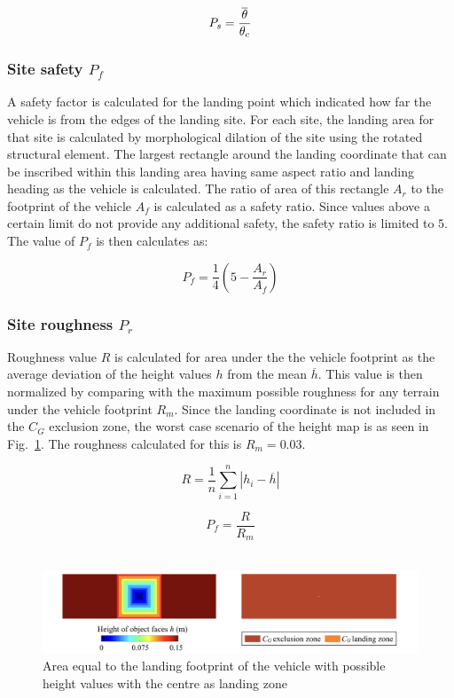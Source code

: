 \begin{equation}
\label{eq:eq9}
\centering
	P_s = \frac{\overline{\theta}}{\theta_c}
\end{equation}
	
\subsubsection{Site safety $P_f$} A safety factor is calculated for the landing point which indicated how far the vehicle is from the edges of the landing site. For each site, the landing area for that site is calculated by morphological dilation of the site using the rotated structural element. The largest rectangle around the landing coordinate that can be inscribed within this landing area having same aspect ratio and landing heading as the vehicle is calculated. The ratio of area of this rectangle $A_r$ to the footprint of the vehicle $A_f$ is calculated as a safety ratio. Since values above a certain limit do not provide any additional safety, the safety ratio is limited to $5$. The value of $P_f$ is then calculates as:

 \begin{equation}
 \label{eq:eq10}
    P_f = \frac{1}{4}\left( 5 - \frac{A_r}{A_f}\right) 
  \end{equation}
	
 \subsubsection{Site roughness $P_r$} Roughness value $R$ is calculated for area under the the vehicle footprint as the average deviation of the height values $h$ from the mean $\overline{h}$. This value is then normalized by comparing with the maximum possible roughness for any terrain under the vehicle footprint $R_m$. Since the landing coordinate is not included in the $C_G$ exclusion zone, the worst case scenario of the height map is as seen in Fig.~\ref{f:mehul22a}. The roughness calculated for this is $R_m = 0.03$.

\begin{equation}
 \label{eq:eq11}
	R = \frac{1}{n} \sum_{i=1}^{n}\left | h_i - \overline{h} \right |
\end{equation} 

\begin{equation}
 \label{eq:eq12}
	P_f = \frac{R}{R_m} 
\end{equation}\\ 

\begin{figure}[!ht]
\centering
\includegraphics[width=6in]{./images/mehul22a.png}
\caption{Area equal to the landing footprint of the vehicle with possible height values with the centre as landing zone}
\label{f:mehul22a}
\end{figure}
 
